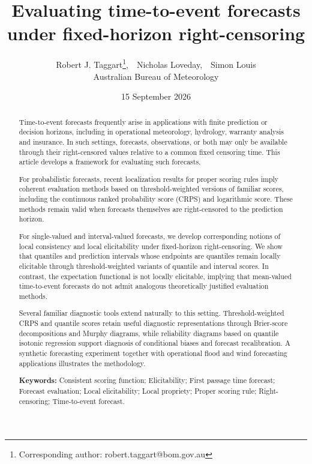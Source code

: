 \documentclass[10pt]{article} %
\title{Evaluating time-to-event forecasts under fixed-horizon right-censoring}
\author{ Robert J. Taggart\thanks{Corresponding author: robert.taggart@bom.gov.au}, \,\, Nicholas Loveday, \,\, Simon Louis\\[1ex] Australian Bureau of Meteorology }
\date{15 September 2026}
\theoremstyle{theorem}
\theoremstyle{definition}
\begin{document}
\maketitle




\begin{abstract}
\noindent Time-to-event forecasts frequently arise in applications with finite prediction or decision horizons, including in operational meteorology, hydrology, warranty analysis and insurance. In such settings, forecasts, observations, or both may only be available through their right-censored values relative to a common fixed censoring time. This article develops a framework for evaluating such forecasts.

For probabilistic forecasts, recent localization results for proper scoring rules imply coherent evaluation methods based on threshold-weighted versions of familiar scores, including the continuous ranked probability score (CRPS) and logarithmic score. These methods remain valid when forecasts themselves are right-censored to the prediction horizon.

For single-valued and interval-valued forecasts, we develop corresponding notions of local consistency and local elicitability under fixed-horizon right-censoring. We show that quantiles and prediction intervals whose endpoints are quantiles remain locally elicitable through threshold-weighted variants of quantile and interval scores. In contrast, the expectation functional is not locally elicitable, implying that mean-valued time-to-event forecasts do not admit analogous theoretically justified evaluation methods.

Several familiar diagnostic tools extend naturally to this setting. Threshold-weighted CRPS and quantile scores retain useful diagnostic representations through Brier-score decompositions and Murphy diagrams, while reliability diagrams based on quantile isotonic regression support diagnosis of conditional biases and forecast recalibration. A synthetic forecasting experiment together with operational flood and wind forecasting applications illustrates the methodology.


\vspace{10pt}

\noindent\textbf{Keywords:} Consistent scoring function; Elicitability; First passage time forecast; Forecast evaluation; Local elicitability; Local propriety; Proper scoring rule; Right-censoring; Time-to-event forecast.
\end{abstract}
\end{document}
